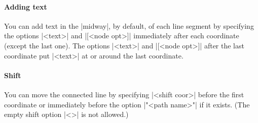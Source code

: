 \begin{tzcode}{.3}
\end{tzcode}

\paragraph{Adding text}

You can add text in the |midway|, by default, of each line segment by specifying the options |{<text>}| and |[<node opt>]| immediately after each coordinate (except the last one).
The options |{<text>}| and |[<node opt>]| after the last coordinate put |<text>| at or around the last coordinate.


\begin{tzcode}{.3}
\end{tzcode}

%
%

\paragraph{Shift}
You can move the connected line by specifying |<shift coor>| before the first coordinate or immediately before the option |"<path name>"| if it exists.
(The empty shift option |<>| is not allowed.)


